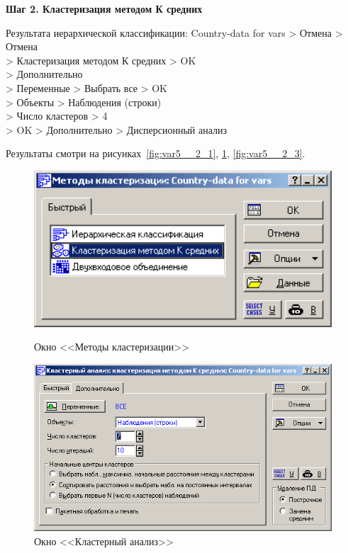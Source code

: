 \newpage

\begin{center}
  \textbf{Шаг 2. Кластеризация методом К средних}
\end{center}

Результата иерархической классификации: Country-data for vars > Отмена > Отмена \\
> Кластеризация методом К средних > OK \\
> Дополнительно \\
> Переменные > Выбрать все > OK \\
> Объекты > Наблюдения (строки) \\
> Число кластеров > 4 \\
> OK > Дополнительно > Дисперсионный анализ

Результаты смотри на рисунках~\ref{fig:var5__2_1}, \ref{fig:var5__2_2}, \ref{fig:var5__2_3}.

\begin{figure}[!h]
  \centering
  \begin{minipage}{0.49\textwidth}
    \centering

    \includegraphics[width=0.99\textwidth]
    {inc/cars_my/var5__2_1.PNG}

    \caption{Окно <<Методы кластеризации>>}
    \label{fig:var5__2_1}
  \end{minipage}
  \begin{minipage}{0.49\textwidth}
    \centering

    \includegraphics[width=0.99\textwidth]
    {inc/cars_my/var5__2_2.PNG}

    \caption{Окно <<Кластерный анализ>>}
    \label{fig:var5__2_2}
  \end{minipage}
\end{figure}

